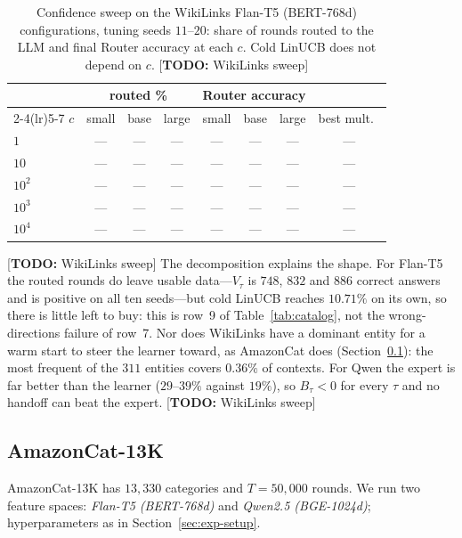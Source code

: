 \documentclass{article}
\theoremstyle{definition}
\theoremstyle{remark}
\theoremstyle{remark}
\newcommand{\todo}[1]{\textcolor{red!70!black}{[\textbf{TODO:} #1]}}
\begin{document}
\begin{table}[h]
\centering
\caption{Confidence sweep on the WikiLinks Flan-T5 (BERT-768d) configurations,
tuning seeds $11$--$20$: share of rounds routed to the LLM and final Router
accuracy at each $c$. Cold LinUCB does not depend on $c$. \todo{WikiLinks sweep}}
\label{tab:wiki-csweep}
\scriptsize
\setlength{\tabcolsep}{4pt}
\begin{tabular}{@{}lccccccc@{}}
\toprule
& \multicolumn{3}{c}{routed \%} & \multicolumn{3}{c}{Router accuracy} & \\
\cmidrule(lr){2-4}\cmidrule(lr){5-7}
$c$ & small & base & large & small & base & large & best mult.\ \\
\midrule
$1$ & --- & --- & --- & --- & --- & --- & --- \\
$10$ & --- & --- & --- & --- & --- & --- & --- \\
$10^2$ & --- & --- & --- & --- & --- & --- & --- \\
$10^3$ & --- & --- & --- & --- & --- & --- & --- \\
$10^4$ & --- & --- & --- & --- & --- & --- & --- \\
\bottomrule
\end{tabular}
\end{table}

\todo{WikiLinks sweep} The decomposition explains the shape. For Flan-T5 the routed rounds do leave
usable data---$V_\tau$ is $748$, $832$ and $886$ correct answers and is
positive on all ten seeds---but cold LinUCB reaches $10.71\%$ on its own, so
there is little left to buy: this is row~9 of Table~\ref{tab:catalog}, not the
wrong-directions failure of row~7. Nor does WikiLinks have a dominant entity
for a warm start to steer the learner toward, as AmazonCat does
(Section~\ref{sec:amazon}): the most frequent of the $311$ entities covers
$0.36\%$ of contexts. For Qwen the expert is far better than the
learner ($29$--$39\%$ against $19\%$), so $B_\tau<0$ for every $\tau$ and no
handoff can beat the expert. \todo{WikiLinks sweep}

\subsection{AmazonCat-13K}
\label{sec:amazon}

AmazonCat-13K has $13{,}330$ categories and $T=50{,}000$ rounds. We run two
feature spaces: \emph{Flan-T5 (BERT-768d)} and \emph{Qwen2.5 (BGE-1024d)};
hyperparameters as in Section~\ref{sec:exp-setup}.
\end{document}
